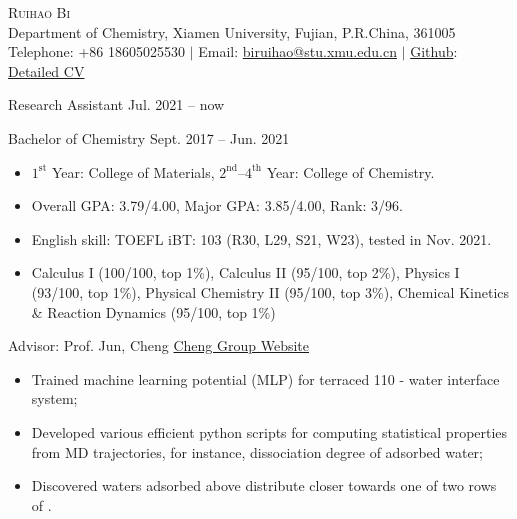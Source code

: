\pagestyle{plain}
\thispagestyle{empty} %
\begin{center}
    \Large{\textsc{Ruihao Bi}} \\ 
    \normalsize {Department of Chemistry, Xiamen University, Fujian, P.R.China, 361005} \\ 
    Telephone: {+86 18605025530} $|$ 
    Email: {\href{mailto:biruihao@stu.xmu.edu.cn}{biruihao@stu.xmu.edu.cn}} $|$ 
    \href{https://github.com/ruihao69}{Github}: \href{https://github.com/ruihao69/brh-cv}{Detailed CV}  \\
\end{center}

\sectionrule
{}

\noindent Research Assistant \hfill {Jul. 2021 -- now}

\noindent Bachelor of Chemistry \hfill {Sept. 2017 -- Jun. 2021}

\begin{itemize}
    \item $\mathrm{1^{st}}$ Year: College of Materials, $\mathrm{2^{nd}}$--$\mathrm{4^{th}}$ Year: College of Chemistry.
    \item Overall GPA: 3.79/4.00, Major GPA: 3.85/4.00, Rank: 3/96.
    \item English skill: TOEFL iBT: 103 (R30, L29, S21, W23), tested in Nov. 2021.
\end{itemize}



\noindent{}
\begin{itemize}
    \item Calculus I (100/100, top 1\%), Calculus II (95/100, top 2\%), Physics I (93/100, top 1\%), Physical Chemistry II (95/100, top 3\%), Chemical Kinetics \& Reaction Dynamics (95/100, top 1\%)
\end{itemize}

\vspace{5mm}
\sectionrule



{\noindent Advisor: Prof. Jun, Cheng  \hfill \href{https://chengjun.xmu.edu.cn/}{Cheng Group Website}}


\begin{itemize}
    \item Trained machine learning potential (MLP) for terraced  110 - water interface system;
    \item Developed various efficient python scripts for computing statistical properties from MD trajectories, for instance, dissociation degree of adsorbed water;
    \item Discovered waters adsorbed above  distribute closer towards one of two rows of .
\end{itemize}

